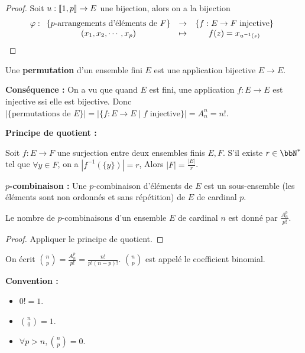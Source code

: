 \begin{proof}
    Soit $u: \llbracket 1, p \rrbracket \to E$ une bijection, alors on a la bijection
    \[ \varphi:
        \begin{array}[t]{ccc}
            \{ p\text{-arrangements d'éléments de } F \} & \to & \{ f: E \to F \text{ injective} \} \\
            (x_1, x_2, \cdots, x_p)                      & \mapsto & f(z) = x_{u^{-1}(z)}
        \end{array}
        \qedhere \]
\end{proof}

\begin{deff}
    Une \textbf{permutation} d'un ensemble fini $E$ est une application bijective $E \to E$.
\end{deff}

\textbf{Conséquence :} On a vu que quand $E$ est fini, une application $f: E \to E$ est injective ssi elle est bijective.
Donc $| \{ \text{permutations de } E \} | = | \{ f: E \to E \mid f \text{ injective} \} | = A_n^n = n!$.

\textbf{Principe de quotient :}
\begin{lem}
    Soit $f: E \to F$ une surjection entre deux ensembles finis $E, F$.
    S'il existe $r \in \bbN^*$ tel que $\forall y \in F$, on a $|f^{-1}(\{y\})| = r$,
    Alors $|F| = \frac{|E|}{r}$.
\end{lem}

\textbf{$p$-combinaison :}
Une $p$-combinaison d'éléments de $E$ est un sous-ensemble (les éléments sont non ordonnés et sans répétition) de $E$ de cardinal $p$.

\begin{thm}
    Le nombre de $p$-combinaisons d'un ensemble $E$ de cardinal $n$ est donné par $\frac{A_n^p}{p!}$.
\end{thm}

\begin{proof}
    Appliquer le principe de quotient.
\end{proof}

\begin{deff}
    On écrit $\binom{n}{p} = \frac{A_n^p}{p!} = \frac{n!}{p!(n-p)!}$.
    $\binom{n}{p}$ est appelé le coefficient binomial.

    \textbf{Convention :}
    \begin{itemize}
        \item $0! = 1$.
        \item $\binom{n}{0} = 1$.
        \item $\forall p > n, \binom{n}{p} = 0$.
    \end{itemize}
\end{deff}

